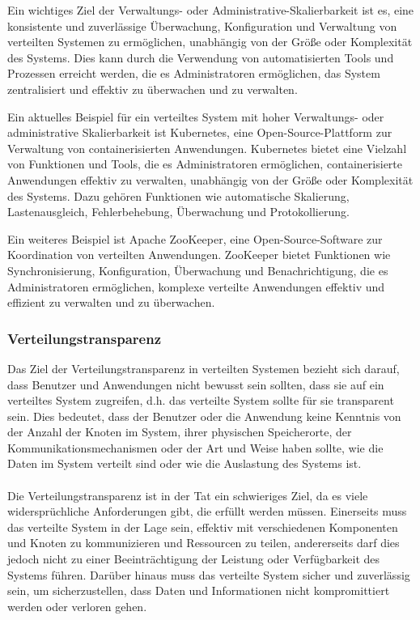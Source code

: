 \documentclass[../vs-script-first-v01.tex]{subfiles}
\begin{document}
\begin{itemize}
Ein wichtiges Ziel der Verwaltungs- oder Administrative-Skalierbarkeit ist es, eine konsistente und zuverlässige Überwachung, Konfiguration und Verwaltung von verteilten Systemen zu ermöglichen, unabhängig von der Größe oder Komplexität des Systems. Dies kann durch die Verwendung von automatisierten Tools und Prozessen erreicht werden, die es Administratoren ermöglichen, das System zentralisiert und effektiv zu überwachen und zu verwalten.

Ein aktuelles Beispiel für ein verteiltes System mit hoher Verwaltungs- oder administrative Skalierbarkeit ist Kubernetes, eine Open-Source-Plattform zur Verwaltung von containerisierten Anwendungen. Kubernetes bietet eine Vielzahl von Funktionen und Tools, die es Administratoren ermöglichen, containerisierte Anwendungen effektiv zu verwalten, unabhängig von der Größe oder Komplexität des Systems. Dazu gehören Funktionen wie automatische Skalierung, Lastenausgleich, Fehlerbehebung, Überwachung und Protokollierung.

Ein weiteres Beispiel ist Apache ZooKeeper, eine Open-Source-Software zur Koordination von verteilten Anwendungen. ZooKeeper bietet Funktionen wie Synchronisierung, Konfiguration, Überwachung und Benachrichtigung, die es Administratoren ermöglichen, komplexe verteilte Anwendungen effektiv und effizient zu verwalten und zu überwachen.
\end{itemize}

\subsubsection{Verteilungstransparenz}

Das Ziel der Verteilungstransparenz in verteilten Systemen bezieht sich darauf, dass Benutzer und Anwendungen nicht bewusst sein sollten, dass sie auf ein verteiltes System zugreifen, d.h. das verteilte System sollte für sie transparent sein. Dies bedeutet, dass der Benutzer oder die Anwendung keine Kenntnis von der Anzahl der Knoten im System, ihrer physischen Speicherorte, der Kommunikationsmechanismen oder der Art und Weise haben sollte, wie die Daten im System verteilt sind oder wie die Auslastung des Systems ist.
\\\\
Die Verteilungstransparenz ist in der Tat ein schwieriges Ziel, da es viele widersprüchliche Anforderungen gibt, die erfüllt werden müssen. Einerseits muss das verteilte System in der Lage sein, effektiv mit verschiedenen Komponenten und Knoten zu kommunizieren und Ressourcen zu teilen, andererseits darf dies jedoch nicht zu einer Beeinträchtigung der Leistung oder Verfügbarkeit des Systems führen. Darüber hinaus muss das verteilte System sicher und zuverlässig sein, um sicherzustellen, dass Daten und Informationen nicht kompromittiert werden oder verloren gehen.
\end{document}
